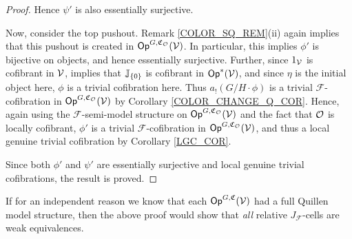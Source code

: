 \documentclass[a4paper,10pt
,draft
]{article}%
\renewcommand{\F}{\mathcal F}
\newcommand{\J}{\mathbb J}
\renewcommand{\1}{\eta}%
\begin{document}
\begin{proof}
      Hence $\psi'$ is also essentially surjective.

      Now, consider the top pushout. Remark \ref{COLOR_SQ_REM}(ii) again implies that this pushout is created in $\mathsf{Op}^{G, \mathfrak C_{\mathcal{O}}}(\mathcal V)$.
      In particular, this implies $\phi'$ is bijective on objects, and hence essentially surjective.
      Further, since $1_{\mathcal V}$ is cofibrant in $\mathcal V$, \cite[Thm. 1.15]{BM13} implies that $\J_{\set 0}$ is cofibrant in $\Op^{\**}(\V)$,
      and since $\1$ is the initial object here, $\phi$ is a trivial cofibration here.
      Thus $a_! (G/H \cdot \phi)$ is a trivial $\F$-cofibration in $\mathsf{Op}^{G, \mathfrak C_{\mathcal{O}}}(\mathcal V)$ by Corollary \ref{COLOR_CHANGE_Q_COR}.
      Hence, again using the $\F$-semi-model structure on $\mathsf{Op}^{G, \mathfrak C_{\mathcal{O}}}(\mathcal V)$ and the fact that $\mathcal{O}$ is locally cofibrant,
      $\phi'$ is a trivial $\F$-cofibration in $\mathsf{Op}^{G,\mathfrak C_{\mathcal{O}}}(\mathcal V)$,
      and thus a local genuine trivial cofibration by Corollary \ref{LGC_COR}.
      
      Since both $\phi'$ and $\psi'$ are essentially surjective and local genuine trivial cofibrations,
      the result is proved.
\end{proof}

\begin{remark}
      \label{OPGCV_F_JC_REM}
      If for an independent reason we know that each $\mathsf{Op}^{G, \mathfrak C}(\mathcal V)$ had a full Quillen model structure,
      then the above proof would show that \textit{all} relative $J_\F$-cells are weak equivalences.
\end{remark}
\end{document}
